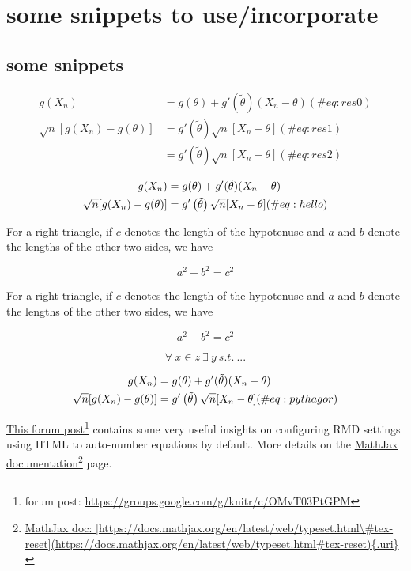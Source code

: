 \documentclass[
]{article}
\begin{document}
\newpage

\hypertarget{some-snippets-to-useincorporate}{%
\section{some snippets to
use/incorporate}\label{some-snippets-to-useincorporate}}

\hypertarget{some-snippets}{%
\subsection{some snippets}\label{some-snippets}}

\[ 
\begin{align} 
  g(X_{n}) & = g(\theta) + g'({\tilde{\theta}})(X_{n} - \theta) (\#eq:res0) \\
  \sqrt{n}[g(X_{n}) - g(\theta)] 
  & = g'\left({\tilde{\theta}}\right) \sqrt{n}[X_{n} -\theta ] (\#eq:res1) \\
  & = g'\left({\tilde{\theta}}\right) \sqrt{n}[X_{n} -\theta ] (\#eq:res2)
\end{align} 
\]

\[
\begin{align}   g(X_{n}) & = g(\theta) + g'({\tilde{\theta}})(X_{n} - \theta) \notag \\  \sqrt{n}[g(X_{n}) - g(\theta)] &  = g'\left({\tilde{\theta}}\right) \sqrt{n}[X_{n} -\theta ] (\#eq:hello)\end{align}
\]

\leavevmode{}%
For a right triangle, if \(c\) denotes the length of the hypotenuse and
\(a\) and \(b\) denote the lengths of the other two sides, we have

\[a^2 + b^2 = c^2\]

For a right triangle, if \(c\) denotes the length of the hypotenuse and
\(a\) and \(b\) denote the lengths of the other two sides, we have

\[a^2 + b^2 = c^2\]

\leavevmode{}%
\[
\forall ~ x \in z ~\exists ~ y~  s.t. ~ ...
\]

\[
\begin{align}   g(X_{n}) & = g(\theta) + g'({\tilde{\theta}})(X_{n} - \theta) \notag \\  \sqrt{n}[g(X_{n}) - g(\theta)] &  = g'\left({\tilde{\theta}}\right) \sqrt{n}[X_{n} -\theta ] (\#eq:pythagor)\end{align}
\]

\href{https://groups.google.com/g/knitr/c/OMvT03PtGPM}{This forum
post}\footnote{forum post:
  \url{https://groups.google.com/g/knitr/c/OMvT03PtGPM}} contains some
very useful insights on configuring RMD settings using HTML to
auto-number equations by default. More details on the
\href{https://docs.mathjax.org/en/latest/web/typeset.html\#tex-reset}{MathJax
documentation}\footnote{\href{https://docs.mathjax.org/en/latest/web/typeset.html\#tex-reset}{MathJax
  doc:
  {[}https://docs.mathjax.org/en/latest/web/typeset.html\textbackslash\#tex-reset{]}(https://docs.mathjax.org/en/latest/web/typeset.html\#tex-reset)\{.uri\}}}
page.
\end{document}
